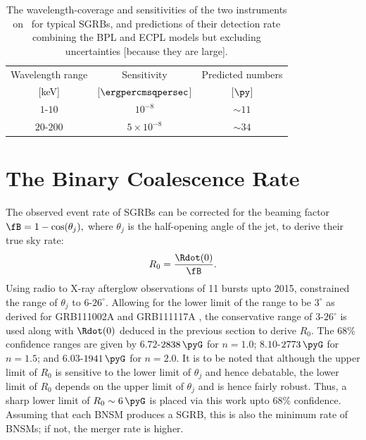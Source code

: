 \begin{table}
\caption[Specifications and short GRB detections estimates for \D]{The wavelength-coverage and sensitivities of the two instruments on \D\ for typical SGRBs, and predictions of their detection rate combining the BPL and ECPL models but excluding uncertainties [because they are large].}
\label{tab:predictions_for_Daksha--short}
\begin{center}
\begin{tabular}{|c|c|c|}
\hline 
Wavelength range & Sensitivity & Predicted numbers\\
 {[keV]} & [$\ergpercmsqpersec$] & [$\py$]\\
\hline
\hline
$1$-$10$ & $10^{-8}$ & $\sim 11$\\
\hline
$20$-$200$ & $5 \times 10^{-8}$ & $\sim 34$\\
\hline
\end{tabular}
\end{center}
\end{table}





\section{The Binary Coalescence Rate}
\label{sec:Events_rate}
The observed event rate of SGRBs can be corrected for the beaming factor $ \fB = 1 - \cos(\theta_j), $ where $ \theta_j $ is the half-opening angle of the jet, to derive their true sky rate:
\begin{equation}
R_0 = \dfrac{ \Rdot(0) }{\fB}.
\end{equation} Using radio to X-ray afterglow observations of 11 bursts upto 2015, \cite{Fong_et_al.-2015-ApJ} constrained the range of $\theta_j$ to $6$-$26^{\circ}.$ Allowing for the lower limit of the range to be $3^{\circ}$ as derived for GRB111002A \citep{Fong_et_al.-2012-ApJ} and GRB111117A \citep{Margutti_et_al.-2012-ApJ}, the conservative range of $3$-$26^{\circ}$ is used along with $\Rdot(0)$ deduced in the previous section to derive $R_0$. The $68 \%$ confidence ranges are given by $6.72$-$2838 \, \pyG $ for $n = 1.0$; $8.10$-$2773 \, \pyG$ for $n = 1.5$; and $6.03$-$1941 \, \pyG $ for $n = 2.0$. It is to be noted that although the upper limit of $R_0$ is sensitive to the lower limit of $\theta_j$ and hence debatable, the lower limit of $R_0$ depends on the upper limit of $\theta_j$ and is hence fairly robust. Thus, a sharp lower limit of $R_0 \sim 6 \, \pyG$ is placed via this work upto $68 \%$ confidence. Assuming that each BNSM produces a SGRB, this is also the minimum rate of BNSMs; if not, the merger rate is higher.

